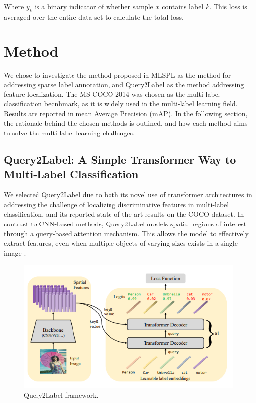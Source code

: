 \documentclass[lettersize,journal]{IEEEtran}
\begin{document}
Where $y_k$ is a binary indicator of whether sample $x$ contains label $k$. This loss is averaged over the entire data set to calculate the total loss. 


\section{Method}
We chose to investigate the method proposed in MLSPL as the method for addressing sparse label annotation, and Query2Label as the method addressing feature localization. The MS-COCO 2014 was chosen as the multi-label classification becnhmark, as it is widely used in the multi-label learning field. Results are reported in mean Average Precision (mAP). In the following section, the rationale behind the chosen methods is outlined, and how each method aims to solve the multi-label learning challenges.


\subsection{Query2Label: A Simple Transformer Way to Multi-Label Classification}
\label{sec:q2l_method}
We selected Query2Label \cite{Query2Label} due to both its novel use of transformer architectures in addressing the challenge of localizing discriminative features in multi-label classification, and its reported state-of-the-art results on the COCO dataset. In contrast to CNN-based methods, Query2Label models spatial regions of interest through a query-based attention mechanism. This allows the model to effectively extract features, even when multiple objects of varying sizes exists in a single image \cite{Query2Label}.

\begin{figure}[t]
    \centering
    \includegraphics[width=.8\linewidth]{images/q2l_framework.PNG}
    \caption{Query2Label framework.}
    \label{fig:q2l_framework}
\end{figure}
\end{document}
